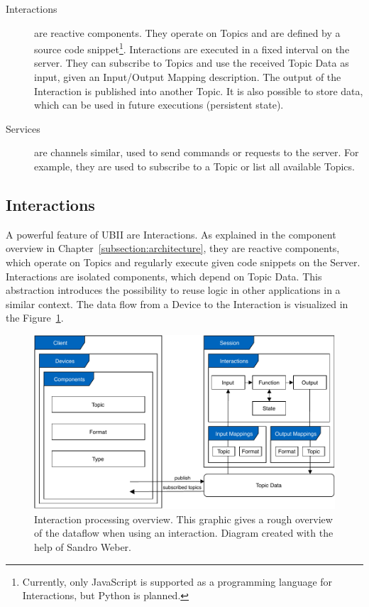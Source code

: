 \begin{description}
	\item[Interactions] are reactive components. They operate on Topics and are defined by a source code snippet\footnote{Currently, only JavaScript is supported as a programming language for Interactions, but Python is planned.}. Interactions are executed in a fixed interval on the server. They can subscribe to Topics and use the received Topic Data as input, given an Input/Output Mapping description. The output of the Interaction is published into another Topic. It is also possible to store data, which can be used in future executions (persistent state).
	\item[Services] are channels similar, used to send commands or requests to the server. For example, they are used to subscribe to a Topic or list all available Topics.
\end{description}


\subsection{Interactions}\label{subsection:interactions}
A powerful feature of \ac{UBII} are Interactions. As explained in the component overview in Chapter~\ref{subsection:architecture}, they are reactive components, which operate on Topics and regularly execute given code snippets on the Server. Interactions are isolated components, which depend on Topic Data. This abstraction introduces the possibility to reuse logic in other applications in a similar context. The data flow from a Device to the Interaction is visualized in the Figure~\ref{fig:ubii-cd}.

\begin{figure}[htpb]
  \centering
  \includegraphics[width=12cm]{figures/implementation/ubii_cd.pdf}
  \caption[UBII communication diagram]{Interaction processing overview. This graphic gives a rough overview of the dataflow when using an interaction. Diagram created with the help of Sandro Weber.}\label{fig:ubii-cd}
\end{figure}

